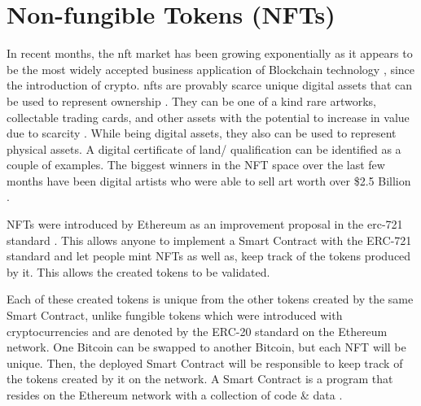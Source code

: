 \documentclass[a4paper, 12pt, oneside]{report}
\begin{document}
\section{Non-fungible Tokens (NFTs)}
In recent months, the \Gls{nft} market has been growing exponentially as it appears to be the most widely accepted business application of Blockchain technology \autocite{dowling_is_2021}, since the introduction of crypto.
\Gls{nft}s are provably scarce unique digital assets that can be used to represent ownership \autocite{noauthor_erc-721_nodate}.
They can be one of a kind rare artworks, collectable trading cards, and other assets with the potential to increase in value due to scarcity \autocite{conti_what_2021, fairfield_tokenized_2021}. While being digital assets, they also can be used to represent physical assets. A digital certificate of land/ qualification can be identified as a couple of examples. The biggest winners in the NFT space over the last few months have been digital artists who were able to sell art worth over \$2.5 Billion \parencite{noauthor_off_2021}.


NFTs were introduced by Ethereum \autocite{wood_ethereum_2014} as an improvement proposal \autocite{noauthor_eip-2309_nodate, noauthor_erc_nodate} in the \gls{erc}-721 standard \autocite{noauthor_erc-721_nodate}. This allows anyone to implement a Smart Contract with the ERC-721 standard and let people mint NFTs as well as, keep track of the tokens produced by it. This allows the created tokens to be validated.

Each of these created tokens is unique from the other tokens created by the same Smart Contract, unlike fungible tokens which were introduced with cryptocurrencies and are denoted by the ERC-20 standard \autocite{noauthor_erc-20_nodate} on the Ethereum network. One Bitcoin can be swapped to another Bitcoin, but each NFT will be unique.
Then, the deployed Smart Contract will be responsible to keep track of the tokens created by it on the network. A Smart Contract is a program that resides on the Ethereum network with a collection of code \& data \autocite{noauthor_introduction_nodate}.
\end{document}
